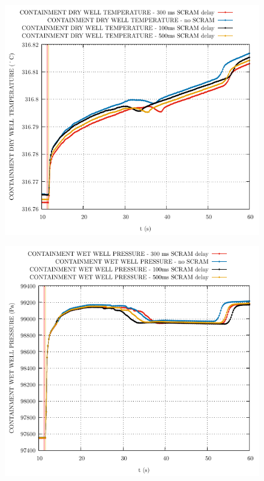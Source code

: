 \documentclass{article}
\begin{document}
\begin{multicols}{2}
\begin{figure}[H]
\end{figure}
\begin{figure}[H]
\centering
\includegraphics[width=\columnwidth]{./graphs/CONTAINMENT DRY WELL TEMPERATURE_comp.pdf}
\end{figure}
\begin{figure}[H]
\centering
\includegraphics[width=\columnwidth]{./graphs/CONTAINMENT WET WELL PRESSURE_comp.pdf}

\end{figure}
\end{multicols}
\end{document}
